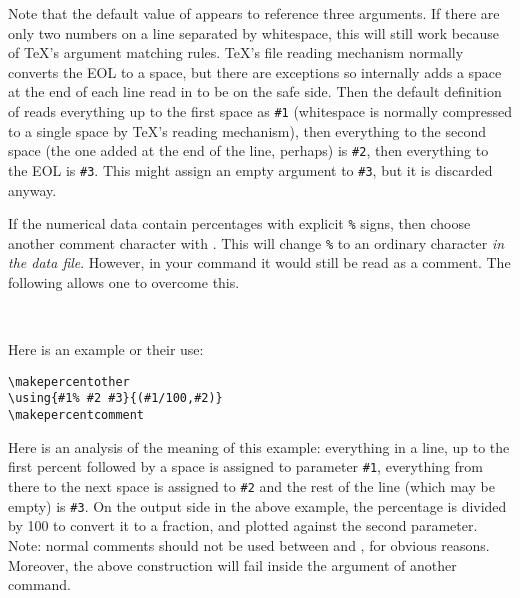 \documentclass[letterpaper]{article}
\begin{document}
Note that the default value of  appears to reference three
arguments. If there are only two numbers on a line separated by
whitespace, this will still work because of \TeX{}'s argument matching
rules. \TeX{}'s file reading mechanism normally converts the EOL to a
space, but there are exceptions so \mfp{} internally adds a space at
the end of each line read in to be on the safe side. Then the default
definition of  reads everything up to the first space as
\texttt{\#1} (whitespace is normally compressed to a single space by
\TeX{}'s reading mechanism), then everything to the second space (the one
added at the end of the line, perhaps) is \texttt{\#2}, then everything
to the EOL is \texttt{\#3}. This might assign an empty argument to
\texttt{\#3}, but it is discarded anyway.

If the numerical data contain percentages with explicit \texttt{\%} signs,
then choose another comment character with . This
will change \texttt{\%} to an ordinary character \emph{in the data file}.
However, in your  command it would still be read as a comment.
The following allows one to overcome this.

\begin{cd}
\\
%
%
\end{cd}

Here is an example or their use:
\begin{verbatim}
\makepercentother
\using{#1% #2 #3}{(#1/100,#2)}
\makepercentcomment
\end{verbatim}

Here is an analysis of the meaning of this example: everything in a
line, up to the first percent followed by a space is assigned to
parameter \texttt{\#1}, everything from there to the next space is
assigned to \texttt{\#2} and the rest of the line (which may be empty)
is \texttt{\#3}. On the output side in the above example, the percentage
is divided by 100 to convert it to a fraction, and plotted against the
second parameter. Note: normal comments should not be used between
 and , for obvious reasons.
Moreover, the above construction will fail inside the argument of
another command.

\begin{cd}
%
\end{cd}
\end{document}
